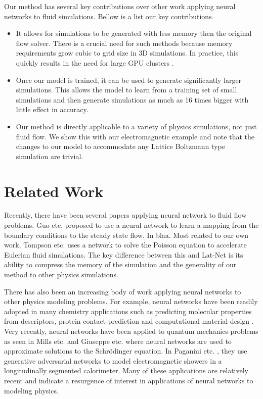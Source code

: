 \documentclass{article}
\begin{document}
Our method has several key contributions over other work applying neural networks to fluid simulations. Bellow is a list our key contributions.
\begin{itemize}
  \item It allows for simulations to be generated with less memory then the original flow solver. There is a crucial need for such methods because memory requirements grow cubic to grid size in 3D simulations. In practice, this quickly results in the need for large GPU clusters \cite{onodera2013large} \cite{xian2011multi}.
  \item Once our model is trained, it can be used to generate significantly larger simulations. This allows the model to learn from a training set of small simulations and then generate simulations as much as 16 times bigger with little effect in accuracy.
  \item Our method is directly applicable to a variety of physics simulations, not just fluid flow. We show this with our electromagnetic example and note that the changes to our model to accommodate any Lattice Boltzmann type simulation are trivial.
\end{itemize}

\section{Related Work}

Recently, there have been several papers applying neural network to fluid flow problems. Guo etc. \cite{guo2016convolutional} proposed to use a neural network to learn a mapping from the boundary conditions to the steady state flow. In \cite{yang2016data} blaa. Most related to our own work, Tompson etc. \cite{tompson2016accelerating} uses a network to solve the Poisson equation to accelerate Eulerian fluid simulations. The key difference between this and Lat-Net is its ability to compress the memory of the simulation and the generality of our method to other physics simulations.

There has also been an increasing body of work applying neural networks to other physics modeling problems. For example, neural networks have been readily adopted in many chemistry applications such as predicting molecular properties from descriptors, protein contact prediction and computational material design \cite{goh2017deep}. Very recently, neural networks have been applied to quantum mechanics problems as seen in Mills etc. \cite{mills2017deep} and Giuseppe etc. \cite{carleo2017solving} where neural networks are used to approximate solutions to the Schrödinger equation. In Paganini etc. \cite{2017arXiv170502355P}, they use generative adversarial networks \cite{goodfellow2014generative} to model electromagnetic showers in a longitudinally segmented calorimeter. Many of these applications are relatively recent and indicate a resurgence of interest in applications of neural networks to modeling physics.
\end{document}
